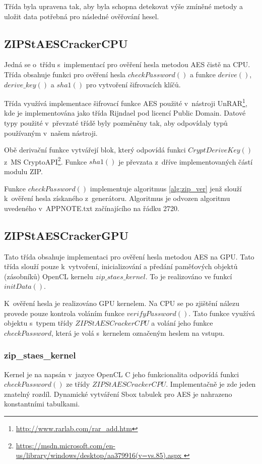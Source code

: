  Třída byla upravena tak, aby byla schopna detekovat výše zmíněné metody a uložit data potřebná pro
následné ověřování hesel.

\subsection{ZIPStAESCrackerCPU}
Jedná se o~třídu s~implementací pro ověření hesla metodou AES čistě na CPU. Třída obsahuje funkci
pro ověření hesla $checkPassword()$ a funkce $derive()$, $derive\_key()$ a $sha1()$ pro vytvoření
šifrovacích klíčů.

Třída využívá implementace šifrovací funkce AES použité v~nástroji
UnRAR\footnote{\url{http://www.rarlab.com/rar\_add.htm}}, kde je implementována jako třída Rijndael
pod licencí Public Domain. Datové typy použité v~převzaté třídě byly pozměněny tak, aby odpovídaly
typů používaným v~našem nástroji.

Obě derivační funkce vytvářejí blok, který odpovídá funkci $CryptDeriveKey()$ z~MS
CryptoAPI\footnote{\url{https://msdn.microsoft.com/en-us/library/windows/desktop/aa379916(v=vs.85).aspx
}}. Funkce $sha1()$ je převzata z~dříve implementovaných částí modulu ZIP.

 Funkce $checkPassword()$ implementuje algoritmus \ref{alg:zip_ver} jenž slouží k~ověření hesla
získaného z~generátoru. Algoritmus je odvozen algoritmu uvedeného v~APPNOTE.txt začínajícího na
řádku 2720.

\subsection{ZIPStAESCrackerGPU}
Tato třída obsahuje implementaci pro ověření hesla metodou AES na GPU. Tato třída slouží pouze
k~vytvoření, inicializování a předání paměťových objektů (zásobníků) OpenCL kernelu
$zip\_staes\_kernel$. To je realizováno ve funkcí $initData()$. 

 K~ověření hesla je realizováno GPU kernelem. Na CPU se po zjištění nálezu provede pouze
kontrola voláním funkce $verifyPassword()$. Tato funkce využívá objektu s~typem třídy
$ZIPStAESCrackerCPU$ a volání jeho funkce $checkPassword$, která je volá s~kernelem označeným
heslem na vstupu.

\subsubsection{zip\_staes\_kernel}
Kernel je na napsán v~jazyce OpenCL C jeho funkcionalita odpovídá funkci \linebreak $checkPassword()$ ze
třídy $ZIPStAESCrackerCPU$. Implementačně je zde jeden znatelný rozdíl. Dynamické vytváření Sbox
tabulek pro AES je nahrazeno konstantními tabulkami.
 
